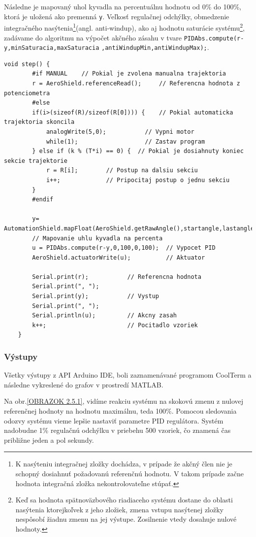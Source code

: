 Následne je mapovaný uhol kyvadla na percentuálnu hodnotu od 0\% do 100\%, ktorá je uložená ako premenná \verb|y|. Veľkosť regulačnej odchýlky, obmedzenie integračného nasýtenia\footnote[9]{K nasýteniu integračnej zložky dochádza, v prípade že akčný člen nie je schopný dosiahnuť požadovanú referenčnú
	hodnotu. V takom prípade začne hodnota integračná zložka nekontrolovateľne stúpať.}(angl. anti-windup), ako aj hodnotu saturácie systému\footnote[10]{Keď sa hodnota spätnoväzbového riadiaceho systému dostane do oblasti nasýtenia ktorejkoľvek z jeho zložiek, zmena vstupu nasýtenej zložky nespôsobí žiadnu zmenu na jej výstupe. Zosilnenie vtedy dosahuje nulové hodnoty.}, zadávame do algoritmu na výpočet akčného zásahu v tvare \verb|PIDAbs.compute(r-y,minSaturacia,maxSaturacia|
\verb|,antiWindupMin,antiWindupMax);|. 


\begin{lstlisting}[caption={Funkcia step().},captionpos=b]
	void step() {            
		#if MANUAL    // Pokial je zvolena manualna trajektoria 
		r = AeroShield.referenceRead();     // Referencna hodnota z potenciometra
		#else         
		if(i>(sizeof(R)/sizeof(R[0]))) {    // Pokial automaticka trajektoria skoncila
			analogWrite(5,0);           // Vypni motor
			while(1);                   // Zastav program
		} else if (k % (T*i) == 0) {  // Pokial je dosiahnuty koniec       sekcie trajektorie
			r = R[i];        // Postup na dalsiu sekciu
			i++;             // Pripocitaj postup o jednu sekciu 
		}
		#endif
		
		y= AutomationShield.mapFloat(AeroShield.getRawAngle(),startangle,lastangle,0.00,100.00);
		// Mapovanie uhlu kyvadla na percenta 
		u = PIDAbs.compute(r-y,0,100,0,100);  // Vypocet PID 
		AeroShield.actuatorWrite(u);          // Aktuator
		
		Serial.print(r);           // Referencna hodnota 
		Serial.print(", ");
		Serial.print(y);           // Vystup 
		Serial.print(", ");
		Serial.println(u);         // Akcny zasah 
		k++;                       // Pocitadlo vzoriek 
	}
\end{lstlisting}

\subsubsection{Výstupy}

Všetky výstupy z API Arduino IDE, boli zaznamenávané programom CoolTerm a následne vykreslené do grafov v prostredí MATLAB. 

Na obr.\ref{OBRAZOK 2.5.1}, vidíme reakciu systému na skokovú zmenu z nulovej referenčnej hodnoty na hodnotu maximálnu, teda 100\%. Pomocou sledovania odozvy systému vieme lepšie nastaviť parametre PID regulátora. Systém nadobudne 1\% regulačnú odchýlku v priebehu 500 vzoriek, čo znamená čas približne jeden a pol sekundy. 

